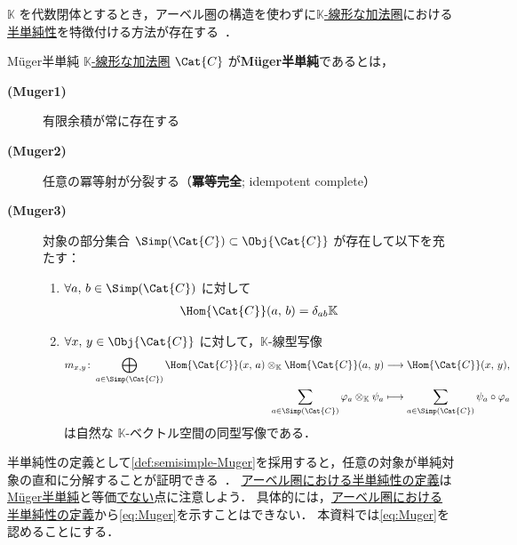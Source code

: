 \documentclass[TQFT_main]{subfiles}
\begin{document}
$\mathbb{K}$ を代数閉体とするとき，アーベル圏の構造を使わずに\hyperref[def:additive-cat]{$\mathbb{K}$-線形な加法圏}における\hyperref[def:semisimple]{半単純性}を特徴付ける方法が存在する~\cite[p.6]{Mueger2002subfactor}．

\begin{mydef}[label=def:semisimple-Muger,breakable]{M\"{u}ger半単純}
    \hyperref[def:additive-cat]{$\mathbb{K}$-線形な加法圏} $\Cat{C}$ が\textbf{M\"{u}ger半単純}であるとは，
    \begin{description}
        \item[\textbf{(Muger1)}] 有限余積が常に存在する
        \item[\textbf{(Muger2)}] 任意の冪等射が分裂する（\textbf{冪等完全}; idempotent complete）
        \item[\textbf{(Muger3)}] 対象の部分集合 $\Simp(\Cat{C}) \subset \Obj{\Cat{C}}$ が存在して以下を充たす：
        \begin{enumerate}
            \item $\forall a,\, b \in \Simp(\Cat{C})$ に対して
            \begin{align}
                \Hom{\Cat{C}}(a,\, b) = \delta_{ab}\mathbb{K}
            \end{align}
            \item $\forall x,\, y \in \Obj{\Cat{C}}$ に対して，$\mathbb{K}$-線型写像
            \begin{align}
                \label{eq:Muger}
                m_{x,y} \colon \bigoplus_{a \in \Simp(\Cat{C})}\Hom{\Cat{C}} (x,\, a) \otimes_{\mathbb{K}} \Hom{\Cat{C}} (a,\, y) &\lto \Hom{\Cat{C}} (x,\, y), \\
                \sum_{a \in \Simp(\Cat{C})} \varphi_a \otimes_{\mathbb{K}} \psi_a &\lmto \sum_{a \in \Simp(\Cat{C})} \psi_a \circ \varphi_a
            \end{align}
            は自然な $\mathbb{K}$-ベクトル空間の同型写像である．
        \end{enumerate}
    \end{description}
\end{mydef}

半単純性の定義として\ref{def:semisimple-Muger}を採用すると，任意の対象が単純対象の直和に分解することが証明できる~\cite[Proposition 28, p.7]{James2017semisimple}．
\hyperref[def:semisimple-cat]{アーベル圏における半単純性の定義}は\hyperref[def:semisimple-Muger]{M\"{u}ger半単純}と等価\underline{でない}点に注意しよう．
具体的には，\hyperref[def:semisimple-cat]{アーベル圏における半単純性の定義}から\eqref{eq:Muger}を示すことはできない．
本資料では\eqref{eq:Muger}を認めることにする．
\end{document}
